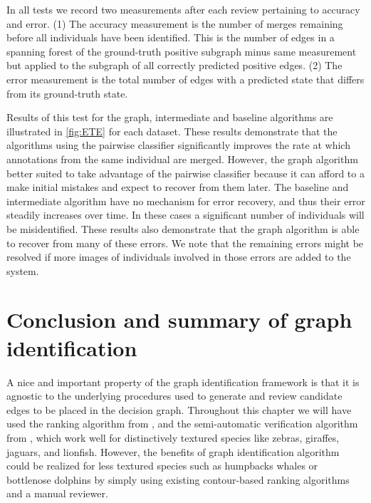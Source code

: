     In all tests we record two measurements after each review pertaining to
      accuracy and error.
    (1) The accuracy measurement is the number of merges remaining before all
      individuals have been identified.
    This is the number of edges in a spanning forest of the ground-truth
      positive subgraph minus same measurement but applied to the subgraph of
      all correctly predicted positive edges.
    (2) The error measurement is the total number of edges with a predicted
      state that differs from its ground-truth state.

    Results of this test for the graph, intermediate and baseline algorithms
      are illustrated in \cref{fig:ETE} for each dataset.
    These results demonstrate that the algorithms using the pairwise
      classifier significantly improves the rate at which annotations from the
      same individual are merged.
    However, the graph algorithm better suited to take advantage of the
      pairwise classifier because it can afford to a make initial mistakes and
      expect to recover from them later.
    The baseline and intermediate algorithm have no mechanism for error
      recovery, and thus their error steadily increases over time.
    In these cases a significant number of individuals will be misidentified.
    These results also demonstrate that the graph algorithm is able to recover
      from many of these errors.
    We note that the remaining errors might be resolved if more images of
      individuals involved in those errors are added to the system.

 
\section{Conclusion and summary of graph identification}\label{sec:graphconclusion}

A nice and important property of the graph identification framework is
  that it is agnostic to the underlying procedures used to generate and review
  candidate edges to be placed in the decision graph.
Throughout this chapter we will have used the ranking algorithm from
  , and the semi-automatic verification algorithm from
  , which work well for distinctively textured species like
  zebras, giraffes, jaguars, and lionfish.
However, the benefits of graph identification algorithm could be realized for
  less textured species such as humpbacks whales or bottlenose dolphins by
  simply using existing contour-based ranking algorithms and a manual reviewer.


